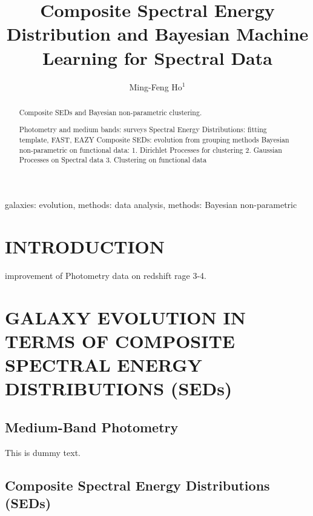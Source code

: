 \documentclass{ar-1col}
\begin{document}

\title{Composite Spectral Energy Distribution and Bayesian Machine Learning for Spectral Data}

\author{Ming-Feng Ho$^1$
}

\begin{abstract}

    
Composite SEDs and Bayesian non-parametric clustering.

Photometry and medium bands: surveys
Spectral Energy Distributions: fitting template, FAST, EAZY
Composite SEDs: evolution from grouping methods
Bayesian non-parametric on functional data:
1. Dirichlet Processes for clustering
2. Gaussian Processes on Spectral data
3. Clustering on functional data 

\end{abstract}

\begin{keywords}
galaxies: evolution, methods: data analysis, methods: Bayesian non-parametric
\end{keywords}
\maketitle

\tableofcontents


\section{INTRODUCTION}
improvement of Photometry data on redshift rage 3-4.


\section{GALAXY EVOLUTION IN TERMS OF COMPOSITE SPECTRAL ENERGY DISTRIBUTIONS (SEDs)}

\subsection{Medium-Band Photometry}
This is dummy text. 

\subsection{Composite Spectral Energy Distributions (SEDs)}
\end{document}
